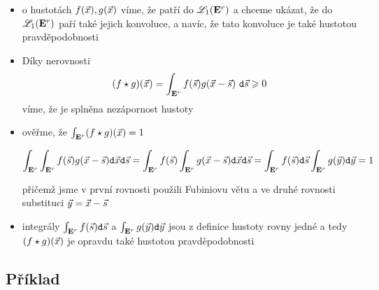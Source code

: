 \begin{itemize}


\item o hustotách $f(\x), g(\x)$ víme, že patří do $\LLL_1(\Er)$ a chceme ukázat, že do $\LLL_1(\Er)$ paří také jejich konvoluce, a navíc, že tato konvoluce je také hustotou pravděpodobnosti

\item Díky nerovnosti $$(f\star g)(\x)=\int_{\Er}f(\sss)g(\x-\sss)~\dss\geq0$$
víme, že je splněna nezápornost hustoty

\item ověřme, že $\int_{\Er}(f\star g)(\x)=1$

$$\int_{\Er}\int_{\Er}f(\sss)g(\x-\sss)\dxx\dss = \int_{\Er}f(\sss)\int_{\Er}g(\x-\sss)\dxx\dss = \int_{\Er}f(\sss)\dss\int_{\Er}g(\y)\dyy=1$$

přičemž jsme v první rovnosti použili Fubiniovu větu a ve druhé rovnosti substituci $\y=\x-\sss$

\item integrály $\int_{\Er}f(\sss)\dss$ a $\int_{\Er}g(\y)\dyy$ jsou z definice hustoty rovny jedné a tedy $(f\star g)(\x)$ je opravdu také hustotou pravděpodobnosti 
\end{itemize}

\subsection{P\v r\'iklad}\label{Meklenburg}

